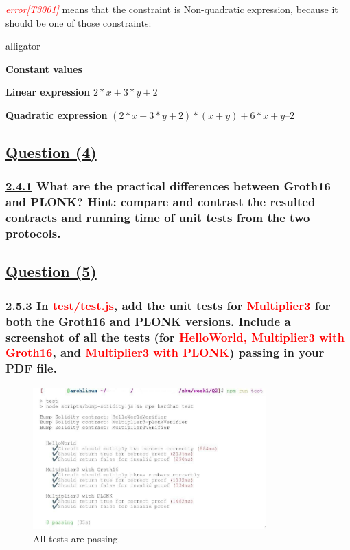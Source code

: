 \documentclass[letterpaper, 10 pt, conference]{ieeeconf}  %
\begin{document}
\textcolor{red}{\textit{error[T3001]}} means that the constraint is Non-quadratic expression, because it should be one of those constraints: \cite{c7}

\begin{labeling}{alligator}
\item [\textbf{Constant values}] 
\item [\textbf{Linear expression}]    $2*x + 3*y + 2$
\item [\textbf{Quadratic expression}] $(2*x + 3*y + 2) * (x+y) + 6*x + y – 2$ 
\end{labeling}  

\subsection{\textbf{\underline{Question (4)}}}
\subsubsection{\textbf{\underline{2.4.1} What are the practical differences between Groth16 and PLONK? Hint: compare and contrast the resulted contracts and running time of unit tests from the two protocols. }}



\subsection{\textbf{\underline{Question (5)}}}
\subsubsection{\textbf{\underline{2.5.3} In \textcolor{red}{test/test.js}, add the unit tests for \textcolor{red}{Multiplier3} for both the Groth16 and PLONK versions. Include a screenshot of all the tests (for \textcolor{red}{HelloWorld, Multiplier3 with Groth16}, and \textcolor{red}{Multiplier3 with PLONK}) passing in your PDF file.}}

\begin{figure}[htp]
    \centering
    \includegraphics[width=9cm]{assets/photo_2022-07-11_08-53-09}
    \caption{All tests are passing.}
    \label{fig:galaxy}
\end{figure}
\end{document}
